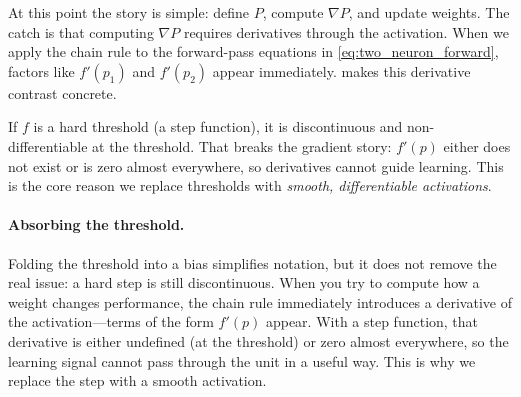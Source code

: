 At this point the story is simple: define $P$, compute $\nabla P$, and update weights. The catch is that computing $\nabla P$ requires derivatives through the activation. When we apply the chain rule to the forward-pass equations in \eqref{eq:two_neuron_forward}, factors like $f'(p_1)$ and $f'(p_2)$ appear immediately.  makes this derivative contrast concrete.

If $f$ is a hard threshold (a step function), it is discontinuous and non\hyp{}differentiable at the threshold. That breaks the gradient story: $f'(p)$ either does not exist or is zero almost everywhere, so derivatives cannot guide learning. This is the core reason we replace thresholds with \emph{smooth, differentiable activations}.

\paragraph{Absorbing the threshold.}
Folding the threshold into a bias simplifies notation, but it does not remove the real issue: a hard step is still discontinuous. When you try to compute how a weight changes performance, the chain rule immediately introduces a derivative of the activation---terms of the form \(f'(p)\) appear. With a step function, that derivative is either undefined (at the threshold) or zero almost everywhere, so the learning signal cannot pass through the unit in a useful way. This is why we replace the step with a smooth activation.

